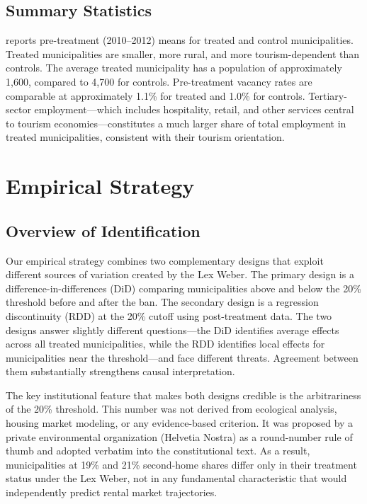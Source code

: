 \documentclass[12pt]{article}
\begin{document}
\subsection{Summary Statistics}

 reports pre-treatment (2010--2012) means for treated and control municipalities. Treated municipalities are smaller, more rural, and more tourism-dependent than controls. The average treated municipality has a population of approximately 1,600, compared to 4,700 for controls. Pre-treatment vacancy rates are comparable at approximately 1.1\% for treated and 1.0\% for controls. Tertiary-sector employment---which includes hospitality, retail, and other services central to tourism economies---constitutes a much larger share of total employment in treated municipalities, consistent with their tourism orientation.




\section{Empirical Strategy}
\label{sec:strategy}

\subsection{Overview of Identification}

Our empirical strategy combines two complementary designs that exploit different sources of variation created by the Lex Weber. The primary design is a difference-in-differences (DiD) comparing municipalities above and below the 20\% threshold before and after the ban. The secondary design is a regression discontinuity (RDD) at the 20\% cutoff using post-treatment data. The two designs answer slightly different questions---the DiD identifies average effects across all treated municipalities, while the RDD identifies local effects for municipalities near the threshold---and face different threats. Agreement between them substantially strengthens causal interpretation.

The key institutional feature that makes both designs credible is the arbitrariness of the 20\% threshold. This number was not derived from ecological analysis, housing market modeling, or any evidence-based criterion. It was proposed by a private environmental organization (Helvetia Nostra) as a round-number rule of thumb and adopted verbatim into the constitutional text. As a result, municipalities at 19\% and 21\% second-home shares differ only in their treatment status under the Lex Weber, not in any fundamental characteristic that would independently predict rental market trajectories.
\end{document}
